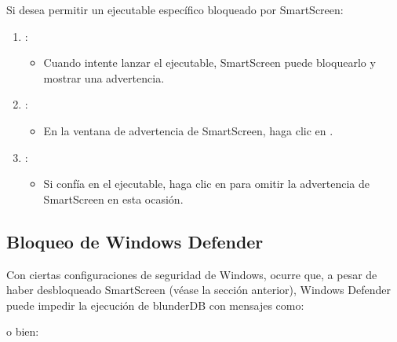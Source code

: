 \documentclass[letterpaper,10pt,spanish]{sphinxmanual}
\begin{document}
\sphinxAtStartPar
Si desea permitir un ejecutable específico bloqueado por SmartScreen:
\begin{enumerate}
%
\item {} 
\sphinxAtStartPar
{}:
\begin{itemize}
\item {} 
\sphinxAtStartPar
Cuando intente lanzar el ejecutable, SmartScreen puede bloquearlo y mostrar una advertencia.

\end{itemize}

\item {} 
\sphinxAtStartPar
{}:
\begin{itemize}
\item {} 
\sphinxAtStartPar
En la ventana de advertencia de SmartScreen, haga clic en .

\end{itemize}

\item {} 
\sphinxAtStartPar
{}:
\begin{itemize}
\item {} 
\sphinxAtStartPar
Si confía en el ejecutable, haga clic en  para omitir la advertencia de SmartScreen en esta ocasión.

\end{itemize}

\end{enumerate}


\subsection{Bloqueo de Windows Defender}
\label{\detokenize{annexe_windows_securite:blocage-windows-defender}}
\sphinxAtStartPar
Con ciertas configuraciones de seguridad de Windows, ocurre que, a pesar de haber desbloqueado SmartScreen (véase la sección anterior), Windows Defender puede impedir la ejecución de blunderDB con mensajes como:

\begin{figure}[htbp]
\centering

\noindent{}
\end{figure}

\sphinxAtStartPar
o bien:
\end{document}
